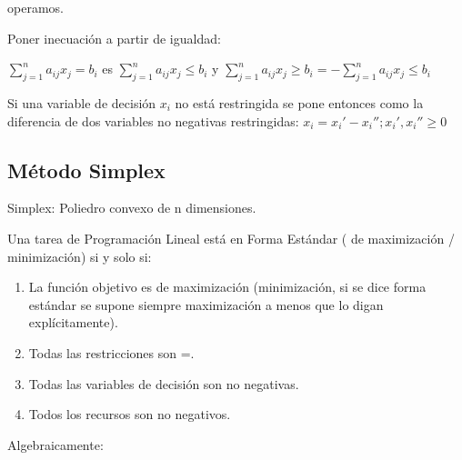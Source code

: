 \documentclass[12pt, twoside, openright]{report} %
\begin{document}
  operamos.

  
Poner inecuación a partir de igualdad:

  \(\sum\limits_{j=1}^{n} a_{i j} x_{j} = b_{i}\) es
  \(\sum\limits_{j=1}^{n} a_{i j} x_{j} \leqslant b_{i}\) y
  \(\sum\limits_{j=1}^{n} a_{i j} x_{j} \geq b_{i}= -\sum\limits_{j=1}^{n} a_{i j} x_{j} \leqslant b_{i}\)

  Si una variable de decisión \(x_i\) no está restringida se pone
  entonces como la diferencia de dos variables no negativas
  restringidas: \(x_i=x_i'-x_i''; x_i',x_i'' \geq 0\)

  
\subsection{Método Simplex}

Simplex: Poliedro convexo de n dimensiones.

    Una tarea de Programación Lineal está en Forma Estándar ( de
    maximización / minimización) si y solo si:

	
  \begin{enumerate}
  \def\labelenumi{\arabic{enumi}.}

  \item
    La función objetivo es de maximización (minimización, si se dice
    forma estándar se supone siempre maximización a menos que lo digan
    explícitamente).

    
  
    \item
      Todas las restricciones son =.
    \item
      Todas las variables de decisión son no negativas.
    \item
      Todos los recursos son no negativos.
  \end{enumerate}
\pagebreak

    Algebraicamente:
\end{document}
